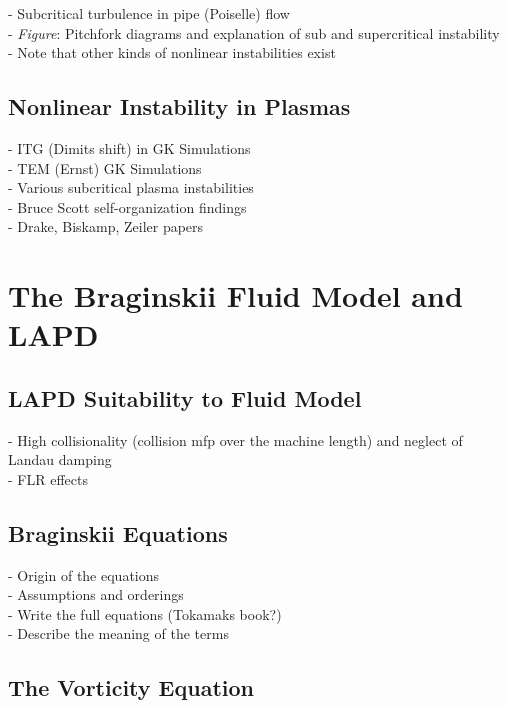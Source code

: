 \documentclass[12pt]{article}
\begin{document}
- Subcritical turbulence in pipe (Poiselle) flow \\
- \emph{Figure}: Pitchfork diagrams and explanation of sub and supercritical instability \\
- Note that other kinds of nonlinear instabilities exist \\

\subsection{Nonlinear Instability in Plasmas}

- ITG (Dimits shift) in GK Simulations \\
- TEM (Ernst) GK Simulations \\
- Various subcritical plasma instabilities \\
- Bruce Scott self-organization findings \\
- Drake, Biskamp, Zeiler papers \\

\section{The Braginskii Fluid Model and LAPD}

\subsection{LAPD Suitability to Fluid Model}

- High collisionality (collision mfp over the machine length) and neglect of Landau damping \\
- FLR effects \\

\subsection{Braginskii Equations}

- Origin of the equations \\
- Assumptions and orderings \\
- Write the full equations (Tokamaks book?) \\
- Describe the meaning of the terms \\

\subsection{The Vorticity Equation}
\end{document}

